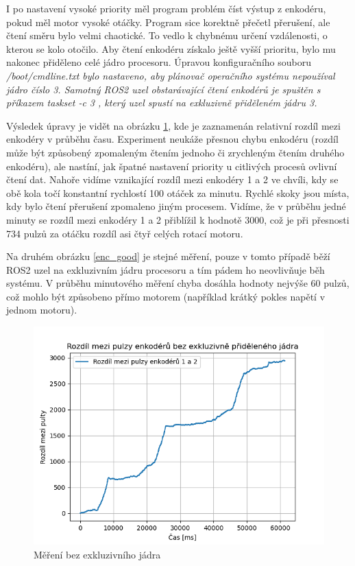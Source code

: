 I po nastavení vysoké priority měl program problém číst výstup z enkodéru, pokud měl motor vysoké otáčky. Program sice korektně přečetl přerušení, ale čtení směru bylo velmi chaotické. To vedlo k chybnému určení vzdálenosti, o kterou se kolo otočilo. Aby čtení enkodéru získalo ještě vyšší prioritu, bylo mu nakonec přiděleno celé jádro procesoru. Úpravou konfiguračního souboru \it /boot/cmdline.txt \rm bylo nastaveno, aby plánovač operačního systému nepoužíval jádro číslo 3. Samotný ROS2 uzel obstarávající čtení enkodérů je spuštěn s příkazem \it taskset -c 3 \rm, který uzel spustí na exkluzivně přiděleném jádru 3.

Výsledek úpravy je vidět na obrázku \ref{enc_bad}, kde je zaznamenán relativní rozdíl mezi enkodéry v průběhu času. Experiment neukáže přesnou chybu enkodéru (rozdíl může být způsobený zpomaleným čtením jednoho či zrychleným čtením druhého enkodéru), ale nastíní, jak špatné nastavení priority u citlivých procesů ovlivní čtení dat. Nahoře vidíme vznikající rozdíl mezi enkodéry 1 a 2 ve chvíli, kdy se obě kola točí konstantní rychlostí 100 otáček za minutu. Rychlé skoky jsou místa, kdy bylo čtení přerušení zpomaleno jiným procesem. Vidíme, že v průběhu jedné minuty se rozdíl mezi enkodéry 1 a 2 přiblížil k hodnotě 3000, což je při přesnosti 734 pulzů za otáčku rozdíl asi čtyř celých rotací motoru. 

Na druhém obrázku \ref{enc_good} je stejné měření, pouze v tomto případě běží ROS2 uzel na exkluzivním jádru procesoru a tím pádem ho neovlivňuje běh systému. V průběhu minutového měření chyba dosáhla hodnoty nejvýše 60 pulzů, což mohlo být způsobeno přímo motorem (například krátký pokles napětí v jednom motoru).

\begin{figure}[H]
    \centering
    \includegraphics[width=0.8\linewidth]{obrazky-figures/bad.png}
    \caption {Měření bez exkluzivního jádra}
    \label{enc_bad}
\end{figure}

